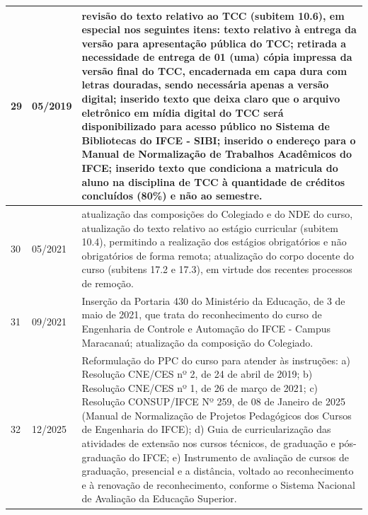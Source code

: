 \begin{center}
\begin{longtable}{lp{2cm}p{11cm}}
		29 & 05/2019 & revisão do texto relativo ao TCC (subitem 10.6), em especial nos seguintes itens: texto relativo à entrega da versão para apresentação pública do TCC; retirada a necessidade de entrega de 01 (uma) cópia impressa da versão final do TCC, encadernada em capa dura com letras douradas, sendo necessária apenas a versão digital; inserido texto que deixa claro que o arquivo eletrônico em mídia digital do TCC será disponibilizado para acesso público no Sistema de Bibliotecas do IFCE - SIBI; inserido o endereço para o Manual de Normalização de Trabalhos Acadêmicos do IFCE; inserido texto que condiciona a matricula do aluno na disciplina de TCC à quantidade de créditos concluídos (80\%) e não ao semestre.\\ \hline
		30 & 05/2021 & atualização das composições do Colegiado e do NDE do curso, atualização do texto relativo ao estágio curricular (subitem 10.4), permitindo a realização dos estágios obrigatórios e não obrigatórios de forma remota; atualização do corpo docente do curso (subitens 17.2 e 17.3), em virtude dos recentes processos de remoção.\\ \hline
		31 & 09/2021 & Inserção da Portaria 430 do Ministério da Educação, de 3 de maio de 2021, que trata do reconhecimento do curso de Engenharia de Controle e Automação do IFCE - Campus Maracanaú; atualização da composição do Colegiado.\\ \hline
		32 & 12/2025 & {
			\vm 
			Reformulação do PPC do curso para atender às instruções: a) Resolução CNE/CES nº 2, de 24 de abril de 2019;
			b) Resolução CNE/CES nº 1, de 26 de março de 2021; c) Resolução CONSUP/IFCE Nº 259, de 08 de Janeiro de 2025 (Manual de Normalização de Projetos Pedagógicos dos Cursos de Engenharia do IFCE); d) Guia de curricularização das atividades de extensão nos cursos técnicos, de graduação e pós-graduação do IFCE; e) Instrumento de avaliação de cursos de graduação, presencial e a distância, voltado ao reconhecimento e à renovação de reconhecimento, conforme o Sistema Nacional de Avaliação da Educação Superior.
		} \\ \hline
		
		
        
	\end{longtable}
\end{center}

